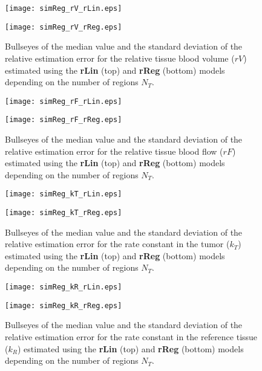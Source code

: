 \begin{figure}
\texttt{[image: simReg\_rV\_rLin.eps]}
\par\vspace{1cm}
\texttt{[image: simReg\_rV\_rReg.eps]}
\caption{Bullseyes of the median value and the standard deviation of the relative estimation error for the relative tissue blood volume ($rV$) estimated using the \textbf{rLin} (top) and \textbf{rReg} (bottom) models depending on the number of regions $N_T$.}
\label{fig:region_rV}
\end{figure}

\begin{figure}
\texttt{[image: simReg\_rF\_rLin.eps]}
\par\vspace{1cm}
\texttt{[image: simReg\_rF\_rReg.eps]}
\caption{Bullseyes of the median value and the standard deviation of the relative estimation error for the relative tissue blood flow ($rF$) estimated using the \textbf{rLin} (top) and \textbf{rReg} (bottom) models depending on the number of regions $N_T$.}
\label{fig:region_rF}
\end{figure}

\begin{figure}
\texttt{[image: simReg\_kT\_rLin.eps]}
\par\vspace{1cm}
\texttt{[image: simReg\_kT\_rReg.eps]}
\caption{Bullseyes of the median value and the standard deviation of the relative estimation error for the rate constant in the tumor ($k_T$) estimated using the \textbf{rLin} (top) and \textbf{rReg} (bottom) models depending on the number of regions $N_T$.}
\label{fig:region_kT}
\end{figure}

\begin{figure}
\texttt{[image: simReg\_kR\_rLin.eps]}
\par\vspace{1cm}
\texttt{[image: simReg\_kR\_rReg.eps]}
\caption{Bullseyes of the median value and the standard deviation of the relative estimation error for the rate constant in the reference tissue ($k_R$) estimated using the \textbf{rLin} (top) and \textbf{rReg} (bottom) models depending on the number of regions $N_T$.}
\label{fig:region_kR}
\end{figure}


